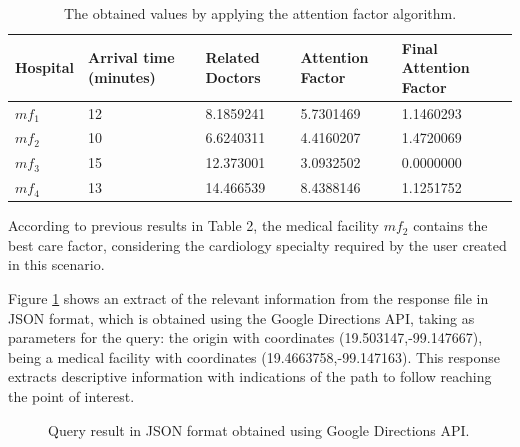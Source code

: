 \documentclass[sustainability,article,submit,pdftex,moreauthors]{Definitions/mdpi}
\begin{document}
\begin{table}[H] 
\caption{The obtained values by applying the attention factor algorithm.\label{table_hospital_info}}
\begin{tabularx}{\textwidth}{CCCCC}
\toprule
\textbf{Hospital} & \textbf{Arrival time (minutes)} & \textbf{Related Doctors} & \textbf{Attention Factor} & \textbf{Final Attention Factor} \\
\midrule
$mf_{1}$ & 12 & 8.1859241 & 5.7301469 & 1.1460293 \\
$mf_{2}$ & 10 & 6.6240311 & 4.4160207 & 1.4720069 \\
$mf_{3}$ & 15 & 12.373001 & 3.0932502 & 0.0000000 \\
$mf_{4}$ & 13 & 14.466539 & 8.4388146 & 1.1251752 \\
\bottomrule
\end{tabularx}
\end{table}
\unskip


According to previous results in Table 2, the medical facility $mf_{2}$ contains the best care factor, considering the cardiology specialty required by the user created in this scenario.


Figure \ref{figure_query_one} shows an extract of the relevant information from the response file in JSON format, which is obtained using the Google Directions API, taking as parameters for the query: the origin with coordinates (19.503147,-99.147667), being a medical facility with coordinates (19.4663758,-99.147163). This response extracts descriptive information with indications of the path to follow reaching the point of interest.

\begin{figure}[H]

\caption{Query result in JSON format obtained using Google Directions API. \\\label{figure_query_one}}
\end{figure}
\unskip
\end{document}
